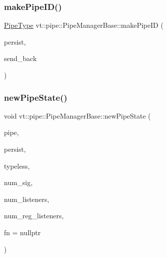 \mbox{\label{structvt_1_1pipe_1_1_pipe_manager_base_af1ba11407837cb69b4d205dd7ba880b0}} 
\subsubsection{\texorpdfstring{make\+Pipe\+I\+D()}{makePipeID()}}
{\footnotesize\ttfamily \hyperlink{namespacevt_ac9852acda74d1896f48f406cd72c7bd3}{Pipe\+Type} vt\+::pipe\+::\+Pipe\+Manager\+Base\+::make\+Pipe\+ID (\begin{DoxyParamCaption}\item[{bool const}]{persist,  }\item[{bool const}]{send\+\_\+back }\end{DoxyParamCaption})\hspace{0.3cm}{\ttfamily [protected]}}

\mbox{\label{structvt_1_1pipe_1_1_pipe_manager_base_a835a8b819cfe7100b723b6d9b22cca57}} 
\subsubsection{\texorpdfstring{new\+Pipe\+State()}{newPipeState()}}
{\footnotesize\ttfamily void vt\+::pipe\+::\+Pipe\+Manager\+Base\+::new\+Pipe\+State (\begin{DoxyParamCaption}\item[{\hyperlink{namespacevt_ac9852acda74d1896f48f406cd72c7bd3}{Pipe\+Type} const \&}]{pipe,  }\item[{bool}]{persist,  }\item[{bool}]{typeless,  }\item[{\hyperlink{namespacevt_ace18d74dd489d9ea506d38789fffce34}{Pipe\+Ref\+Type}}]{num\+\_\+sig,  }\item[{\hyperlink{namespacevt_ace18d74dd489d9ea506d38789fffce34}{Pipe\+Ref\+Type}}]{num\+\_\+listeners,  }\item[{\hyperlink{namespacevt_ace18d74dd489d9ea506d38789fffce34}{Pipe\+Ref\+Type}}]{num\+\_\+reg\+\_\+listeners,  }\item[{\hyperlink{structvt_1_1pipe_1_1_pipe_manager_base_a983e301505317c5ba2041461e7dec84a}{Dispatch\+Func\+Type}}]{fn = {\ttfamily nullptr} }\end{DoxyParamCaption})\hspace{0.3cm}{\ttfamily [protected]}}

